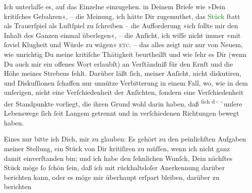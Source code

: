 \pstart
           Ich unterlaſſe es, auf das Einzelne {\pb}einzugehen.
                  \label{K_L03440-3v}\label{K_L03440-3h} in
               Deinem Briefe wie »Dein kritiſches Gebahren«, – die Meinung, ich hätte Dir
               zugemuthet, das \textcolor{green}{Stück}{}\ledrightnote{{$\rightarrow$}\textcolor{green}{Der einsame Weg. Schauspiel in fünf Akten}} ſtatt
               als Trauerſpiel als Luſtſpiel zu ſchreiben – die Aufforderung »ich ſollte  mir den Inhalt des Ganzen einmal überlegen«, – die
               Anſicht, ich wiſſe nicht immer »mit ſoviel Klugheit und Würde zu wägen« \textsc{etc.} – das alles zeigt mir nur von Neuem, wie unrichtig Du
                   meine kritiſche Thätigkeit beurtheilſt und \strikeout{\textcolor{gray}{mit}} wie ſehr es Dir (wenn Du auch mir ein offenes Wort erlaubſt) an Verſtändniß
               für den Ernſt und die Höhe meines Strebens fehlt. Darüber läßt ſich, meiner Anſicht,
               nicht diskutiren, und Diskuſſionen ſchaffen nur 
               unnütze Verbitterung in einem Fall, wo, wie in dem {\pb}unſerigen, nicht eine Verſchiedenheit der Anſichten, ſondern eine Verſchiedenheit
               der Standpunkte vorliegt, die ihren Grund wohl darin haben, daß \substVorne{}\textsuperscript{ſich d\textcolor{gray}{×}\-\textcolor{gray}{×}}{\allowbreak}\substDazwischen{}unſere\substHinten{} Lebenswege ſich ſeit Langem getrennt und in verſchiedenen Richtungen bewegt
               haben.\pend
           
\pstart
           Eines nur bitte ich Dich, mir zu glauben: Es gehört zu den peinlichſten Aufgaben
               meiner Stellung, ein Stück von Dir \strikeout{\textcolor{gray}{×}} kritiſiren zu müſſen, wenn ich nicht ganz damit einverſtanden bin; und ich
               habe den ſehnlichen Wunſch, Dein nächſtes Stück möge ſo ſchön ſein, daß ich mit
               rückhaltsloſer Anerkennung darüber berichten kann, oder es \strikeout{\textcolor{gray}{×}} möge mir überhaupt
               erſpart bleiben, darüber zu berichten{\dotsfive}\pend
           
